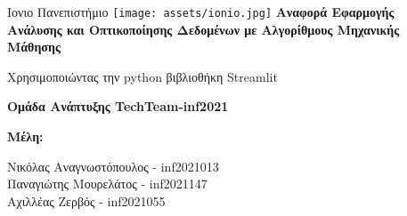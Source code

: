 \documentclass[a4paper,12pt]{article}
\begin{document}
\begin{titlepage}

    \fontsize{60pt}{35pt}\selectfont
    \begin{center}
        \Large
        \Huge
        \vfill
        Ιονιο Πανεπιστήμιο
        \vfill
        \texttt{[image: assets/ionio.jpg]}
        \vfill
        \fontsize{23pt}{23pt}\selectfont
        \vspace{0.3cm}
        \Huge
        \textbf{Αναφορά Εφαρμογής \\ \fontsize{15pt}{15pt}\selectfont Aνάλυσης και Οπτικοποίησης Δεδομένων με Αλγορίθμους Μηχανικής Μάθησης}
        
        \vspace{0.3cm}
        \large
        Χρησιμοποιώντας την python βιβλιοθήκη Streamlit
        \Huge
        \vspace{1cm}
        
        \textbf{Ομάδα Ανάπτυξης TechTeam-inf2021}
        
        \vfill
        
        \Large
        \textbf{Μέλη:}
        \vspace{0.3cm}
        
        \Large
        Νικόλας Αναγνωστόπουλος - inf2021013\\
        Παναγιώτης Μουρελάτος - inf2021147\\
        Αχιλλέας Ζερβός - inf2021055
        
        
        
        
        
        
        
        
    \end{center}
\end{titlepage}




\newpage




\tableofcontents


\newpage
\end{document}
